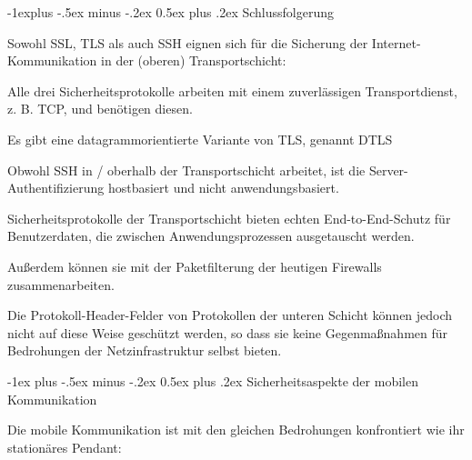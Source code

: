 \documentclass[a4paper]{article}
\makeatletter
\renewcommand{\section}{\@startsection{section}{1}{0mm}%
 {-1ex plus -.5ex minus -.2ex}%
 {0.5ex plus .2ex}%
 {\normalfont\large\bfseries}}
\renewcommand{\subsection}{\@startsection{subsection}{2}{0mm}%
 {-1explus -.5ex minus -.2ex}%
 {0.5ex plus .2ex}%
 {\normalfont\normalsize\bfseries}}
\makeatother
\begin{document}
\begin{multicols}{3}
\begin{itemize*}
            \subsection{Schlussfolgerung}

            \begin{itemize*}
                  \item
                  Sowohl SSL, TLS als auch SSH eignen sich für die Sicherung der
                  Internet-Kommunikation in der (oberen) Transportschicht:

                  \begin{itemize*}
                        \item Alle drei Sicherheitsprotokolle arbeiten mit einem zuverlässigen Transportdienst, z. B. TCP, und benötigen diesen.
                        \item Es gibt eine datagrammorientierte Variante von TLS, genannt DTLS
                        \item Obwohl SSH in / oberhalb der Transportschicht arbeitet, ist die Server-Authentifizierung hostbasiert und nicht anwendungsbasiert.
                        \item Sicherheitsprotokolle der Transportschicht bieten echten End-to-End-Schutz für Benutzerdaten, die zwischen Anwendungsprozessen ausgetauscht werden.
                        \item Außerdem können sie mit der Paketfilterung der heutigen Firewalls zusammenarbeiten.
                        \item Die Protokoll-Header-Felder von Protokollen der unteren Schicht können jedoch nicht auf diese Weise geschützt werden, so dass sie keine Gegenmaßnahmen für Bedrohungen der Netzinfrastruktur selbst bieten.
                  \end{itemize*}
            \end{itemize*}


            \section{Sicherheitsaspekte der mobilen
              Kommunikation}

            \begin{itemize*}
                  \item
                  Die mobile Kommunikation ist mit den gleichen Bedrohungen konfrontiert
                  wie ihr stationäres Pendant:


\end{itemize*}
\end{itemize*}
\end{multicols}
\end{document}
